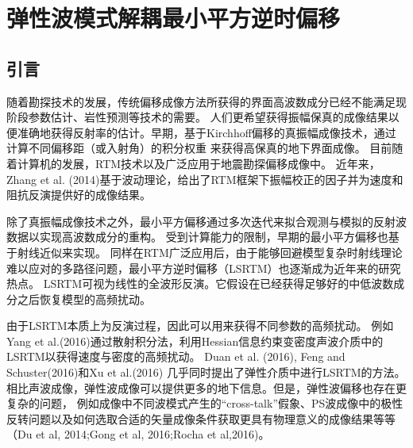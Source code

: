 \chapter{弹性波模式解耦最小平方逆时偏移}
\label{cha:MD-ELSRTM}
\section{引言}
随着勘探技术的发展，传统偏移成像方法所获得的界面高波数成分已经不能满足现阶段参数估计、岩性预测等技术的需要。
人们更希望获得振幅保真的成像结果以便准确地获得反射率的估计。早期，基于Kirchhoff偏移的真振幅成像技术，通过计算不同偏移距（或入射角）的积分权重
来获得高保真的地下界面成像\cite{BeylkinEtAl1985,Bleistein1987}。
目前随着计算机的发展，RTM技术以及广泛应用于地震勘探偏移成像中。
近年来，Zhang et al.
(2014)\cite{Zhang2014}基于波动理论，给出了RTM框架下振幅校正的因子并为速度和阻抗反演提供好的成像结果。

除了真振幅成像技术之外，最小平方偏移通过多次迭代来拟合观测与模拟的反射波数据以实现高波数成分的重构。
受到计算能力的限制，早期的最小平方偏移也基于射线近似来实现\cite{Schuster1993,Nemeth1999}。
同样在RTM广泛应用后，由于能够回避模型复杂时射线理论难以应对的多路径问题，最小平方逆时偏移（LSRTM）也逐渐成为近年来的研究热点。
LSRTM可视为线性的全波形反演。它假设在已经获得足够好的中低波数成分之后恢复模型的高频扰动。


由于LSRTM本质上为反演过程，因此可以用来获得不同参数的高频扰动。
例如Yang et
al.(2016)\cite{Yang2016}通过散射积分法，利用Hessian信息约束变密度声波介质中的LSRTM以获得速度与密度的高频扰动。
Duan et al. (2016)\cite{Duan2016}, Feng and Schuster(2016)\cite{Feng2016}和Xu et al.(2016)
\cite{Xu2016}几乎同时提出了弹性介质中进行LSRTM的方法。
相比声波成像，弹性波成像可以提供更多的地下信息。但是，弹性波偏移也存在更复杂的问题，
例如成像中不同波模式产生的“cross-talk”假象、PS波成像中的极性反转问题以及如何选取合适的矢量成像条件获取更具有物理意义的成像结果等等（Du et al,
2014\cite{DuEtAl2014};Gong et
al, 2016\cite{GongEtAl2016};Rocha et al,2016\cite{RochaEtAl2016a})。

